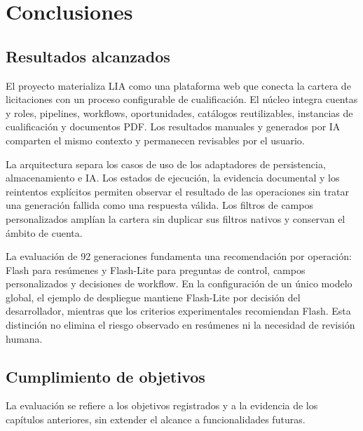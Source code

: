 \chapter{Conclusiones}
\label{chap:conclusions}

\section{Resultados alcanzados}

El proyecto materializa LIA como una plataforma web que conecta la cartera de
licitaciones con un proceso configurable de cualificación. El núcleo integra
cuentas y roles, pipelines, workflows, oportunidades, catálogos reutilizables,
instancias de cualificación y documentos PDF. Los resultados manuales y
generados por IA comparten el mismo contexto y permanecen revisables por el
usuario.

La arquitectura separa los casos de uso de los adaptadores de persistencia,
almacenamiento e IA. Los estados de ejecución, la evidencia documental y los
reintentos explícitos permiten observar el resultado de las operaciones sin
tratar una generación fallida como una respuesta válida. Los filtros de campos
personalizados amplían la cartera sin duplicar sus filtros nativos y conservan
el ámbito de cuenta.

La evaluación de 92 generaciones fundamenta una recomendación por operación:
Flash para resúmenes y Flash-Lite para preguntas de control, campos
personalizados y decisiones de workflow. En la configuración de un único
modelo global, el ejemplo de despliegue mantiene Flash-Lite por decisión del
desarrollador, mientras que los criterios experimentales recomiendan Flash.
Esta distinción no elimina el riesgo observado en resúmenes ni la necesidad
de revisión humana.

\section{Cumplimiento de objetivos}

La evaluación se refiere a los objetivos registrados y a la evidencia de los
capítulos anteriores, sin extender el alcance a funcionalidades futuras.

